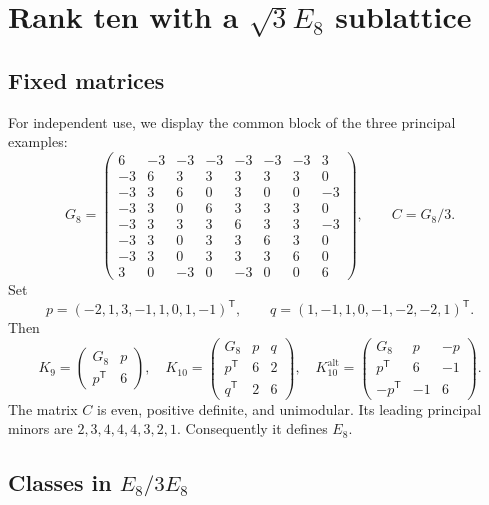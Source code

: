 \documentclass[11pt,a4paper]{article}
\theoremstyle{remark}\newtheorem{remark}[theorem]{Remark}
\newcommand{\Kalt}{K_{10}^{\mathrm{alt}}}
\begin{document}
\section{Rank ten with a \texorpdfstring{$\sqrt3E_8$}{sqrt(3)E8} sublattice}

\subsection{Fixed matrices}

For independent use, we display the common block of the three principal examples:
\[
G_8=\begin{pmatrix}
6&-3&-3&-3&-3&-3&-3&3\\
-3&6&3&3&3&3&3&0\\
-3&3&6&0&3&0&0&-3\\
-3&3&0&6&3&3&3&0\\
-3&3&3&3&6&3&3&-3\\
-3&3&0&3&3&6&3&0\\
-3&3&0&3&3&3&6&0\\
3&0&-3&0&-3&0&0&6
\end{pmatrix},\qquad C=G_8/3.
\]
Set
\[
p=(-2,1,3,-1,1,0,1,-1)^{\mathsf T},\qquad
q=(1,-1,1,0,-1,-2,-2,1)^{\mathsf T}.
\]
Then
\begin{equation}\label{eq:examples}
K_9=\begin{pmatrix}G_8&p\\p^{\mathsf T}&6\end{pmatrix},\quad
K_{10}=\begin{pmatrix}G_8&p&q\\p^{\mathsf T}&6&2\\q^{\mathsf T}&2&6\end{pmatrix},\quad
\Kalt=\begin{pmatrix}G_8&p&-p\\p^{\mathsf T}&6&-1\\-p^{\mathsf T}&-1&6\end{pmatrix}.
\end{equation}
The matrix $C$ is even, positive definite, and unimodular. Its leading principal minors are $2,3,4,4,4,3,2,1$. Consequently it defines $E_8$.

\subsection{Classes in \texorpdfstring{$E_8/3E_8$}{E8/3E8}}
\end{document}

